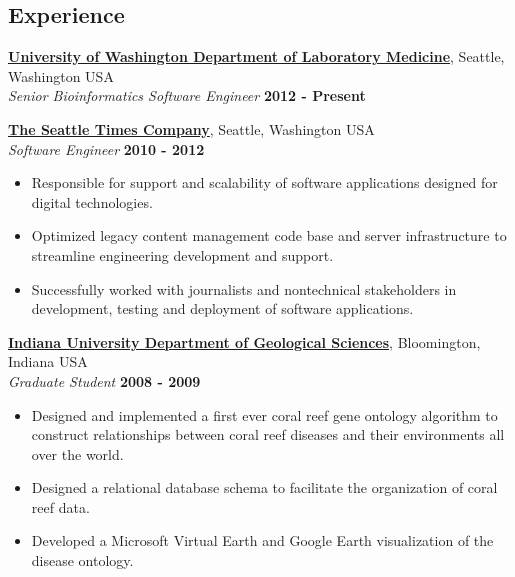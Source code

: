 \documentclass{res}
\begin{document}
\address{1136B 15th Ave\\Seattle, WA 98122}
\address{\textit{T:} (630) 788-0468\\\textit{Email:} crosenth@gmail.com\\
         \textit{Github:} \url{https://github.com/crosenth}}
\begin{resume}


\section{Experience}

\href{http://depts.washington.edu/labweb/}{\textbf{University of Washington Department of Laboratory Medicine}},
Seattle, Washington USA\\
\textit{Senior Bioinformatics Software Engineer} \hfill \textbf{2012 - Present}

\href{http://www.seattletimes.com/}{\textbf{The Seattle Times Company}},
Seattle, Washington USA\\
\textit{Software Engineer} \hfill \textbf{2010 - 2012}
\begin{itemize} \itemsep -2pt
\item Responsible for support and scalability of software applications designed for digital technologies.
\item Optimized legacy content management code base and server infrastructure to streamline engineering development and support.
\item Successfully worked with journalists and nontechnical stakeholders in development, testing and deployment of software applications.
\end{itemize}

\href{http://geology.indiana.edu/}{\textbf{Indiana University Department of Geological Sciences}}, Bloomington, Indiana USA\\
\textit{Graduate Student} \hfill \textbf{2008 - 2009}
\begin{itemize} \itemsep -2pt
\item Designed and implemented a first ever coral reef gene ontology algorithm to construct relationships between coral reef diseases and their environments all over the world.
\item Designed a relational database schema to facilitate the organization of coral reef data.
\item Developed a Microsoft Virtual Earth and Google Earth visualization of the disease ontology.
\end{itemize}


\end{resume}
\end{document}
